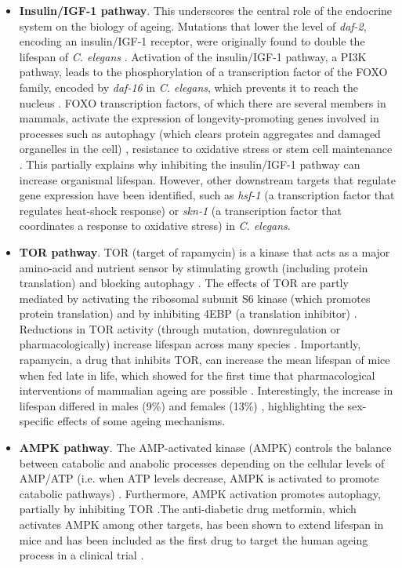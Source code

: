 \begin{itemize} 

	\item \textbf{Insulin/\acrshort{IGF-1} pathway}. This underscores the central role of the endocrine system on the biology of ageing. Mutations that lower the level of \textit{daf-2}, encoding an insulin/IGF-1 receptor, were originally found to double the lifespan of \textit{C. elegans} \cite{Kenyon1993,Guarente2000}. Activation of the insulin/IGF-1 pathway, a PI3K pathway, leads to the phosphorylation of a transcription factor of the FOXO family, encoded by \textit{daf-16} in \textit{C. elegans}, which prevents it to reach the nucleus \cite{Lin2001}. FOXO transcription factors, of which there are several members in mammals, activate the expression of longevity-promoting genes involved in processes such as autophagy (which clears protein aggregates and damaged organelles in the cell) \cite{Singh2019}, resistance to oxidative stress or stem cell maintenance \cite{Martins2016}. This partially explains why inhibiting the insulin/IGF-1 pathway can increase organismal lifespan. However, other downstream targets that regulate gene expression have been identified, such as \textit{hsf-1} (a transcription factor that regulates heat-shock response) \cite{Hsu2003} or \textit{skn-1} (a transcription factor that coordinates a response to oxidative stress) \cite{Tullet2008} in \textit{C. elegans}.
	
	\item \textbf{\acrshort{TOR} pathway}. \acrshort{TOR} (target of rapamycin) is a kinase that acts as a major amino-acid and nutrient sensor by stimulating growth (including protein translation) and blocking autophagy \cite{Kenyon2010}. The effects of TOR are partly mediated by activating the ribosomal subunit S6 kinase (which promotes protein translation) and by inhibiting 4EBP (a translation inhibitor)  \cite{Kenyon2010,Um2006}. Reductions in TOR activity (through mutation, downregulation or pharmacologically) increase lifespan across many species \cite{Kenyon2010}. Importantly, rapamycin, a drug that inhibits TOR, can increase the mean lifespan of mice when fed late in life, which showed for the first time that pharmacological interventions of mammalian ageing are possible \cite{Harrison2009}. Interestingly, the increase in lifespan differed in males (9\%) and females (13\%) \cite{Harrison2009}, highlighting the sex-specific effects of some ageing mechanisms. 
	
	\item \textbf{AMPK pathway}. The AMP-activated kinase (\acrshort{AMPK}) controls the balance between catabolic and anabolic processes depending on the cellular levels of \acrshort{AMP}/\acrshort{ATP} (i.e. when ATP levels decrease, AMPK is activated to promote catabolic pathways) \cite{Kenyon2010,Mihaylova2011}. Furthermore, AMPK activation promotes autophagy, partially by inhibiting TOR \cite{Mihaylova2011}.The anti-diabetic drug metformin, which activates AMPK among other targets, has been shown to extend lifespan in mice \cite{Anisimov2008,Martin-Montalvo2013} and has been included as the first drug to target the human ageing process in a clinical trial \cite{Barzilai2016}.
		

\end{itemize}
